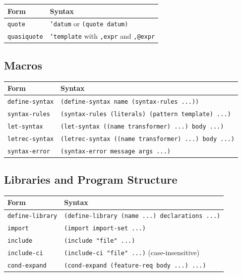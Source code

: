 \begin{center}
\small
\begin{tabularx}{\textwidth}{@{}lY@{}}
\textbf{Form} & \textbf{Syntax} \\
\hline
\texttt{quote} & \texttt{'datum} or \texttt{(quote datum)} \\
\texttt{quasiquote} & \texttt{`template} with \texttt{,expr} and \texttt{,@expr} \\
\end{tabularx}
\end{center}

\subsection*{Macros}

\begin{center}
\small
\begin{tabularx}{\textwidth}{@{}lY@{}}
\textbf{Form} & \textbf{Syntax} \\
\hline
\texttt{define-syntax} & \texttt{(define-syntax name (syntax-rules ...))} \\
\texttt{syntax-rules} & \texttt{(syntax-rules (literals) (pattern template) ...)} \\
\texttt{let-syntax} & \texttt{(let-syntax ((name transformer) ...) body ...)} \\
\texttt{letrec-syntax} & \texttt{(letrec-syntax ((name transformer) ...) body ...)} \\
\texttt{syntax-error} & \texttt{(syntax-error message args ...)} \\
\end{tabularx}
\end{center}

\subsection*{Libraries and Program Structure}

\begin{center}
\small
\begin{tabularx}{\textwidth}{@{}lY@{}}
\textbf{Form} & \textbf{Syntax} \\
\hline
\texttt{define-library} & \texttt{(define-library (name ...) declarations ...)} \\
\texttt{import} & \texttt{(import import-set ...)} \\
\texttt{include} & \texttt{(include "file" ...)} \\
\texttt{include-ci} & \texttt{(include-ci "file" ...)} (case-insensitive) \\
\texttt{cond-expand} & \texttt{(cond-expand (feature-req body ...) ...)} \\
\end{tabularx}
\end{center}

